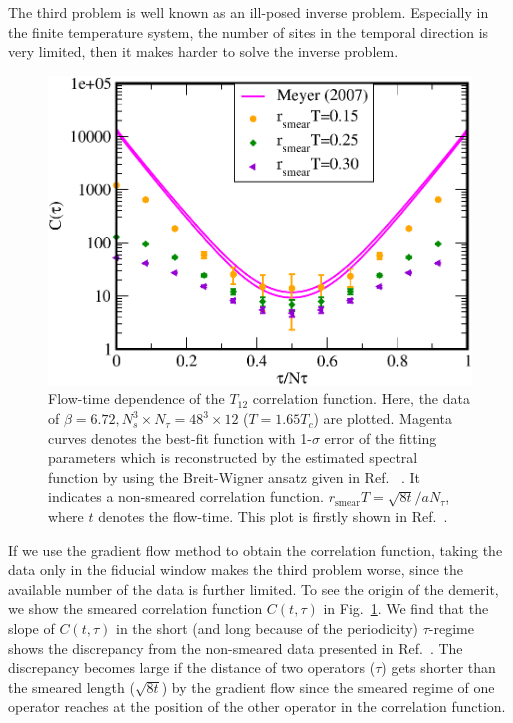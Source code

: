 \documentclass[a4paper,11pt]{article}
\begin{document}
The third problem is well known as an ill-posed inverse problem. 
Especially in the finite temperature system, the number of sites in the temporal direction is very limited, then it makes harder to solve the inverse problem.
\begin{figure}[h]
\begin{center}
\includegraphics[scale=0.45]{./plot-corr-T12T12-rT-deps.pdf}
\caption{Flow-time dependence of the $T_{12}$ correlation function. Here, the data of $\beta=6.72, N_s^3\times N_\tau=48^3 \times12$ ($T=1.65T_c$) are plotted. Magenta curves denotes the best-fit function with 1-$\sigma$ error of the fitting parameters which is reconstructed by the estimated spectral function by using the Breit-Wigner ansatz given in Ref.~\cite{Meyer:2007ic} . It indicates a non-smeared correlation function. $r_{\mbox{smear}}T=\sqrt{8t}/aN_\tau$, where $t$ denotes the flow-time. This plot is firstly shown in Ref.~\cite{Itou:2017ypy}.
}
\label{fig:T12T12-corr-flowtime-deps}
\end{center}
\end{figure}
If we use the gradient flow method to obtain the correlation function, taking the data only in the fiducial window makes the third problem worse, since the available number of the data is further limited.
To see the origin of the demerit, we show the smeared correlation function $C(t,\tau)$ in Fig.~\ref{fig:T12T12-corr-flowtime-deps}. 
We find that 
the slope of $C(t,\tau)$ in the short (and long because of the periodicity) $\tau$-regime shows the discrepancy from the non-smeared data presented in Ref.~\cite{Meyer:2007ic}.
The discrepancy becomes large if the distance of two operators ($\tau$) gets shorter than the smeared length ($\sqrt{8t}$) by the gradient flow since the smeared regime of one operator reaches at the position of the other operator in the correlation function.
\end{document}
